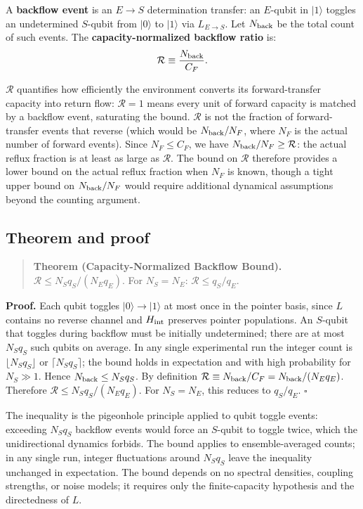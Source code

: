 \documentclass[aps,pra,twocolumn,superscriptaddress,hyperref]{revtex4-2}
\begin{document}
A \textbf{backflow event} is an $E \to S$ determination transfer: an $E$-qubit in $|1\rangle$ toggles an undetermined $S$-qubit from $|0\rangle$ to $|1\rangle$ via $L_{E\to S}$. Let $N_{\rm back}$ be the total count of such events. The \textbf{capacity-normalized backflow ratio} is:
\begin{equation}
\mathcal{R} \equiv \frac{N_{\rm back}}{C_F}.
\end{equation}

$\mathcal{R}$ quantifies how efficiently the environment converts its forward-transfer capacity into return flow: $\mathcal{R}=1$ means every unit of forward capacity is matched by a backflow event, saturating the bound. $\mathcal{R}$ is not the fraction of forward-transfer events that reverse (which would be $N_{\rm back}/N_F$, where $N_F$ is the actual number of forward events). Since $N_F \leq C_F$, we have $N_{\rm back}/N_F \geq \mathcal{R}$: the actual reflux fraction is at least as large as $\mathcal{R}$. The bound on $\mathcal{R}$ therefore provides a lower bound on the actual reflux fraction when $N_F$ is known, though a tight upper bound on $N_{\rm back}/N_F$ would require additional dynamical assumptions beyond the counting argument.

\subsection{Theorem and proof}

\begin{quote}
\textbf{Theorem (Capacity-Normalized Backflow Bound).}
$\mathcal{R} \leq N_S q_S / (N_E q_E)$.
For $N_S = N_E$: $\mathcal{R} \leq q_S/q_E$.
\end{quote}

\textbf{Proof.}
Each qubit toggles $|0\rangle \to |1\rangle$ at most once in the pointer basis, since $L$ contains no reverse channel and $H_{\rm int}$ preserves pointer populations. An $S$-qubit that toggles during backflow must be initially undetermined; there are at most $N_S q_S$ such qubits on average. In any single experimental run the integer count is $\lfloor N_S q_S \rfloor$ or $\lceil N_S q_S \rceil$; the bound holds in expectation and with high probability for $N_S \gg 1$. Hence $N_{\rm back} \leq N_S q_S$. By definition $\mathcal{R} \equiv N_{\rm back}/C_F = N_{\rm back}/(N_E q_E)$. Therefore $\mathcal{R} \leq N_S q_S/(N_E q_E)$. For $N_S = N_E$, this reduces to $q_S/q_E$. $\square$

The inequality is the pigeonhole principle applied to qubit toggle events: exceeding $N_S q_S$ backflow events would force an $S$-qubit to toggle twice, which the unidirectional dynamics forbids. The bound applies to ensemble-averaged counts; in any single run, integer fluctuations around $N_S q_S$ leave the inequality unchanged in expectation. The bound depends on no spectral densities, coupling strengths, or noise models; it requires only the finite-capacity hypothesis and the directedness of $L$.
\end{document}

